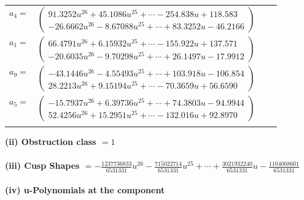\documentclass[1p]{elsarticle_modified}
\theoremstyle{definition}
\begin{document}
\begin{tabular}{m{7pt} m{180pt} m{7pt} m{180pt} }
\flushright $a_{4}=$&$\begin{pmatrix}91.3252 u^{26}+45.1086 u^{25}+\cdots-254.838 u+118.583\\-26.6662 u^{26}-8.67088 u^{25}+\cdots+83.3252 u-46.2166\end{pmatrix}$ \\
\flushright $a_{1}=$&$\begin{pmatrix}66.4791 u^{26}+6.15932 u^{25}+\cdots-155.922 u+137.571\\-20.6035 u^{26}-9.70298 u^{25}+\cdots+26.1497 u-17.9912\end{pmatrix}$ \\
\flushright $a_{9}=$&$\begin{pmatrix}-43.1446 u^{26}-4.55493 u^{25}+\cdots+103.918 u-106.854\\28.2213 u^{26}+9.15194 u^{25}+\cdots-70.3659 u+56.6590\end{pmatrix}$ \\
\flushright $a_{5}=$&$\begin{pmatrix}-15.7937 u^{26}+6.39736 u^{25}+\cdots+74.3803 u-94.9944\\52.4256 u^{26}+15.2951 u^{25}+\cdots-132.016 u+92.8970\end{pmatrix}$\\&\end{tabular}
\flushleft \textbf{(ii) Obstruction class $= 1$}\\~\\
\flushleft \textbf{(iii) Cusp Shapes $= -\frac{1237736833}{6531331} u^{26}-\frac{715022714}{6531331} u^{25}+\cdots+\frac{3021932240}{6531331} u-\frac{1104068601}{6531331}$}\\~\\
\newpage\renewcommand{\arraystretch}{1}
\flushleft \textbf{(iv) u-Polynomials at the component}\newline \\
\end{document}

